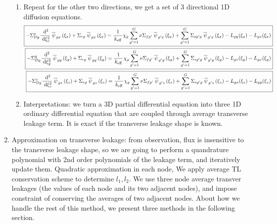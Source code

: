 \documentclass{school-22.211-notes}
\begin{document}
\begin{enumerate}
\begin{enumerate}
  \item Repeat for the other two directions, we get a set of 3 directional 1D diffusion equations.
    \begin{align}
      \boxed{ - \Sigma_{Dg}^x \frac{\mbox{ }\mathrm{d}^2}{\mbox{ }\mathrm{d} \xi_x^2} \left.\overline{\psi} \right._{gx} (\xi_x) + \Sigma_{rg} \left.\overline{\psi} \right._{gx} (\xi_x) = \frac{1}{\left. k_{\mathrm{eff}} \right.} \chi_g \displaystyle\sum_{g'=1}^G \nu \Sigma_{fg'} \left.\overline{\psi} \right._{g'x} (\xi_x) + \displaystyle\sum_{g'=1}^G \Sigma_{sg'g} \left.\overline{\psi} \right._{g'x} (\xi_x) - L_{gy} (\xi_x) - L_{gz} (\xi_x) } \notag \\
   \boxed{ - \Sigma_{Dg}^y \frac{\mbox{ }\mathrm{d}^2}{\mbox{ }\mathrm{d} \xi_y^2} \left.\overline{\psi} \right._{gy} (\xi_y) + \Sigma_{rg} \left.\overline{\psi} \right._{gy} (\xi_y) = \frac{1}{\left. k_{\mathrm{eff}} \right.} \chi_g \displaystyle\sum_{g'=1}^G \nu \Sigma_{fg'} \left.\overline{\psi} \right._{g'y} (\xi_y) + \displaystyle\sum_{g'=1}^G \Sigma_{sg'g} \left.\overline{\psi} \right._{g'y} (\xi_y) - L_{gz} (\xi_y) - L_{gx} (\xi_y) }  \notag \\
     \boxed{ - \Sigma_{Dg}^z \frac{\mbox{ }\mathrm{d}^2}{\mbox{ }\mathrm{d} \xi_z^2} \left.\overline{\psi} \right._{gz} (\xi_z) + \Sigma_{rg} \left.\overline{\psi} \right._{gz} (\xi_z) = \frac{1}{\left. k_{\mathrm{eff}} \right.} \chi_g \displaystyle\sum_{g'=1}^G \nu \Sigma_{fg'} \left.\overline{\psi} \right._{g'z} (\xi_z) + \displaystyle\sum_{g'=1}^G \Sigma_{sg'g} \left.\overline{\psi} \right._{g'z} (\xi_z) - L_{gx} (\xi_z) - L_{gy} (\xi_z) } \notag
    \end{align}

  \item Interpretations: we turn a 3D partial differential equation into three 1D ordinary differential equation that are coupled through average transverse leakage term. It is exact if the transverse leakage shape is known. 
  \end{enumerate}

\item Approximation on transverse leakage: from observation, flux is insensitive to the transverse leakage shape, so we are going to perform a quandrature polynomial with 2nd order polynomials of the leakage term, and iteratively update them. Quadratic approximation in each node, 
  We apply average TL conservation scheme to determine $l_1, l_2$. We use three node average transver leakages (the values of each node and its two adjacent nodes), and impose constraint of conserving the averages of two adjacent nodes. About how we handle the rest of this method, we present three methods in the following section. 
\end{enumerate}
\end{document}
